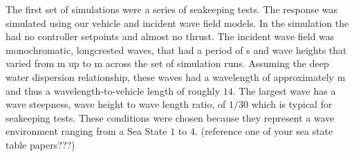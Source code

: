 \documentclass[utf8]{frontiersSCNS} %
\begin{document}
The first set of simulations were a series of seakeeping tests. The \wamv{} response was simulated using our vehicle and incident wave field models. In the simulation the \wamv{} had no controller setpoints and almost no thrust. The incident wave field was monochromatic, longcrested waves, that had a period of \unit[6]{s} and wave heights that varied from \unit[0]{m} up to \unit[2]{m} across the set of simulation runs. Assuming the deep water dispersion relationship, these waves had a wavelength of approximately \unit[56]{m} and thus a wavelength-to-vehicle length of roughly $14$. The largest wave has a wave steepness, wave height to wave length ratio, of $1/30$ which is typical for seakeeping tests. These conditions were chosen because they represent a wave environment ranging from a Sea State $1$ to $4$. (reference one of your sea state table papers???)
\end{document}
